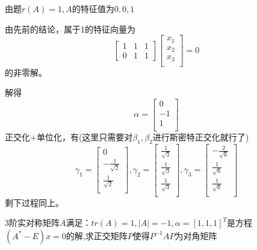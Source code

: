 \documentclass[lang=cn,10pt]{elegantbook}
\begin{document}
\begin{solution}
	
	由题$r(A)=1,A$的特征值为$ 0,0,1$
	
	由先前的结论，属于1的特征向量为
	\begin{equation*}
		\begin{bmatrix}
			1& 1 & 1\\
			0& 1 &1
		\end{bmatrix}\left[ \begin{array}{c}
			x_1\\
			x_2\\
			x_3\\
		\end{array} \right]=0
	\end{equation*}
	的非零解。
	
	解得
	\begin{equation*}
		\alpha=\left[ \begin{array}{c}
			0\\
			-1\\
			1\\
		\end{array} \right] 
	\end{equation*}
正交化+单位化，有(这里只需要对$\beta_{1},\beta_{2}$进行斯密特正交化就行了)
	\begin{equation*}
		\gamma_{1}=\left[ \begin{array}{c}
			0\\
			-\frac{1}{\sqrt{2}}\\
			\frac{1}{\sqrt{2}}\\
		\end{array} \right],
		\gamma_{2}=\left[ \begin{array}{c}
		\frac{1}{\sqrt{3}}\\
		\frac{1}{\sqrt{3}}\\
		\frac{1}{\sqrt{3}}\\
		\end{array} \right],
		\gamma_{3}=\left[ \begin{array}{c}
			-\frac{2}{\sqrt{6}}\\
			\frac{1}{\sqrt{6}}\\
			\frac{1}{\sqrt{6}}\\
		\end{array} \right]
	\end{equation*}
	剩下过程同上。
\end{solution}
\begin{example}
	3阶实对称矩阵$A$满足：$tr(A)=1,|A|=-1,\alpha=[1,1,1]^{T}$是方程$(A^{*}-E)x=0$的解,求正交矩阵$P$使得$P^{-1}AP$为对角矩阵
\end{example}
\end{document}
